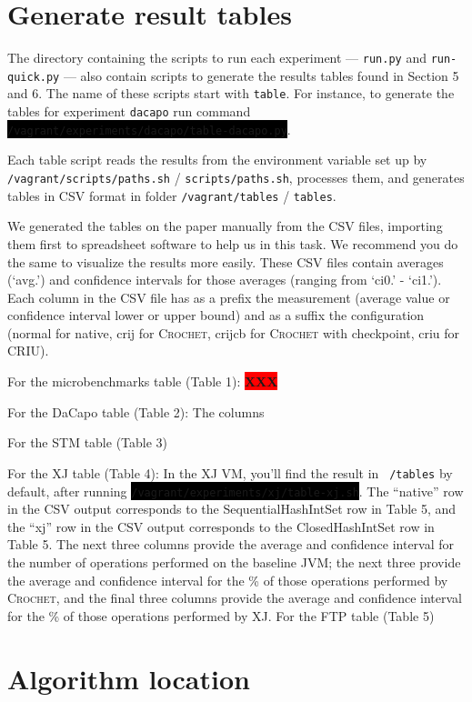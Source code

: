 \documentclass[12pt]{article}
\newcommand{\command}[1]{\colorbox{black}{\texttt{\color{white}#1}}}
\newcommand{\host}[1]{\colorbox{blue!20}{\texttt{\color{black}#1}}}
\newcommand{\vm}[1]{\colorbox{green!20}{\texttt{\color{black}#1}}}
\newcommand{\XXX}{\colorbox{red}{\bf\color{white}XXX}}
\newcommand{\sysname}{\textsc{Crochet}\xspace}
\begin{document}
\section{Generate result tables}
\label{sec:tables}

The directory containing the scripts to run each experiment --- \texttt{run.py}
and \texttt{run-quick.py} --- also contain scripts to generate the results
tables found in Section 5 and 6.  The name of these scripts start with
\texttt{table}.  For instance, to generate the tables for experiment
\texttt{dacapo} run command\linebreak
\command{/vagrant/experiments/dacapo/table-dacapo.py}.

Each table script reads the results from the environment variable set up by
\vm{/vagrant/scripts/paths.sh} / \host{scripts/paths.sh}, processes them, and
generates tables in CSV format in folder \vm{/vagrant/tables} / \host{tables}.

We generated the tables on the paper manually from the CSV files, importing them
first to spreadsheet software to help us in this task.  We recommend you do the
same to visualize the results more easily. These CSV files contain averages (`avg.') and confidence intervals for those averages (ranging from `ci0.' - `ci1.'). Each column in the CSV file has as a prefix the measurement (average value or confidence interval lower or upper bound) and as a suffix the configuration (normal for native, crij for \sysname, crijcb for \sysname with checkpoint, criu for CRIU).

For the microbenchmarks table (Table 1):
\XXX

For the DaCapo table (Table 2): The columns

For the STM table (Table 3)

For the XJ table (Table 4): In the XJ VM, you'll find the result in \vm{~/tables} by default, after running \command{/vagrant/experiments/xj/table-xj.sh}. The ``native'' row in the CSV output corresponds to the SequentialHashIntSet row in Table 5, and the ``xj'' row in the CSV output corresponds to the ClosedHashIntSet row in Table 5. The next three columns provide the average and confidence interval for the number of operations performed on the baseline JVM; the next three provide the average and confidence interval for the \% of those operations performed by \sysname, and the final three columns provide the average and confidence interval for the \% of those operations performed by XJ.
For the FTP table (Table 5)
\section{Algorithm location}
\label{sec:algorithm}
\end{document}
